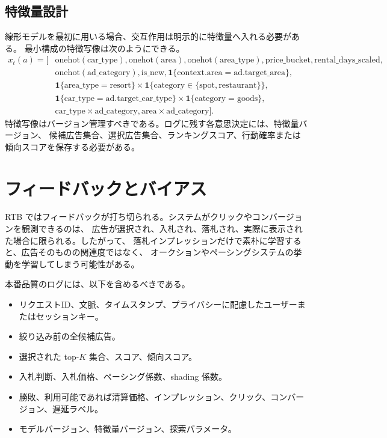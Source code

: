 \documentclass[uplatex,dvipdfmx,11pt,a4paper]{bxjsarticle}
\newcommand{\ind}{\mathbf{1}}
\begin{document}
\subsection{特徴量設計}
線形モデルを最初に用いる場合、交互作用は明示的に特徴量へ入れる必要がある。
最小構成の特徴写像は次のようにできる。
\begin{align}
  x_t(a)=\big[&\mathrm{onehot}(\mathrm{car\_type}),
  \mathrm{onehot}(\mathrm{area}),
  \mathrm{onehot}(\mathrm{area\_type}),
  \mathrm{price\_bucket},
  \mathrm{rental\_days\_scaled},\\
  &\mathrm{onehot}(\mathrm{ad\_category}),
  \mathrm{is\_new},
  \ind\{\mathrm{context.area}=\mathrm{ad.target\_area}\},\\
  &\ind\{\mathrm{area\_type=resort}\}\times
    \ind\{\mathrm{category}\in\{\mathrm{spot},\mathrm{restaurant}\}\},\\
  &\ind\{\mathrm{car\_type}=\mathrm{ad.target\_car\_type}\}\times
    \ind\{\mathrm{category=goods}\},\\
  &\mathrm{car\_type}\times\mathrm{ad\_category},
  \mathrm{area}\times\mathrm{ad\_category}
  \big].
\end{align}
特徴写像はバージョン管理すべきである。ログに残す各意思決定には、特徴量バージョン、
候補広告集合、選択広告集合、ランキングスコア、行動確率または傾向スコアを保存する必要がある。

\section{フィードバックとバイアス}
RTB ではフィードバックが打ち切られる。システムがクリックやコンバージョンを観測できるのは、
広告が選択され、入札され、落札され、実際に表示された場合に限られる。したがって、
落札インプレッションだけで素朴に学習すると、広告そのものの関連度ではなく、
オークションやペーシングシステムの挙動を学習してしまう可能性がある。

本番品質のログには、以下を含めるべきである。
\begin{itemize}[leftmargin=2em]
  \item リクエストID、文脈、タイムスタンプ、プライバシーに配慮したユーザーまたはセッションキー。
  \item 絞り込み前の全候補広告。
  \item 選択された top-$K$ 集合、スコア、傾向スコア。
  \item 入札判断、入札価格、ペーシング係数、shading 係数。
  \item 勝敗、利用可能であれば清算価格、インプレッション、クリック、コンバージョン、遅延ラベル。
  \item モデルバージョン、特徴量バージョン、探索パラメータ。
\end{itemize}
\end{document}
